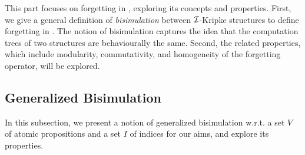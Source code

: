 \documentclass[twoside,11pt]{article}
\begin{document}
This part focuses on forgetting in \CTL, exploring its concepts and properties. %
 First, we give a general definition of \emph{bisimulation} between ${\cal I}$-Kripke structures to define forgetting in \CTL.
The notion of bisimulation captures the idea that the computation trees of two structures are behaviourally the same.
Second, the related properties, which include modularity, commutativity, and homogeneity of the forgetting operator, will be explored.

\subsection{Generalized Bisimulation}
In this subsection, we present a notion of generalized bisimulation  w.r.t. a set $V$ of atomic propositions and a set $I$ of indices for our aims, and explore its properties.
\end{document}

